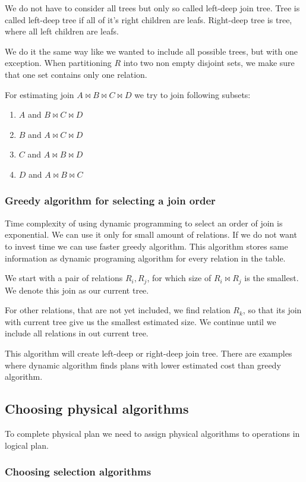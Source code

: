 We do not have to consider all trees but only so called left-deep join tree. Tree is called left-deep tree if all of it's right children are leafs. Right-deep tree is tree, where all left children are leafs.
 
We do it the same way like we wanted to include all possible trees, but with one exception. When partitioning $R$ into two non empty disjoint sets, we make sure that one set contains only one relation.

For estimating join $A\Join B\Join C\Join D$ we try to join following subsets:
\begin{enumerate}
\item $A$ and $B\Join C\Join D$
\item $B$ and $A\Join C\Join D$
\item $C$ and $A\Join B\Join D$
\item $D$ and $A\Join B\Join C$
\end{enumerate}

\subsubsection{Greedy algorithm for selecting a join order}
\label{greedyalgorithm}
Time complexity of using dynamic programming to select an order of join is exponential. We can use it only for small amount of relations. If we do not want to invest time we can use faster greedy algorithm. This algorithm stores same information as dynamic programing algorithm for every relation in the table.

We start with a pair of relations $R_i, R_j$, for which size of $R_i \Join R_j$ is the smallest. We denote this join as our current tree.

For other relations, that are not yet included, we find relation $R_k$, so that its join with current tree give us the smallest estimated size. We continue until we include all relations in out current tree. 

This algorithm will create left-deep or right-deep join tree. There are examples where dynamic algorithm finds plans with lower estimated cost than greedy algorithm.
 
\subsection{Choosing physical algorithms}

To complete physical plan we need to assign physical algorithms to operations in logical plan.
\subsubsection{Choosing selection algorithms}

